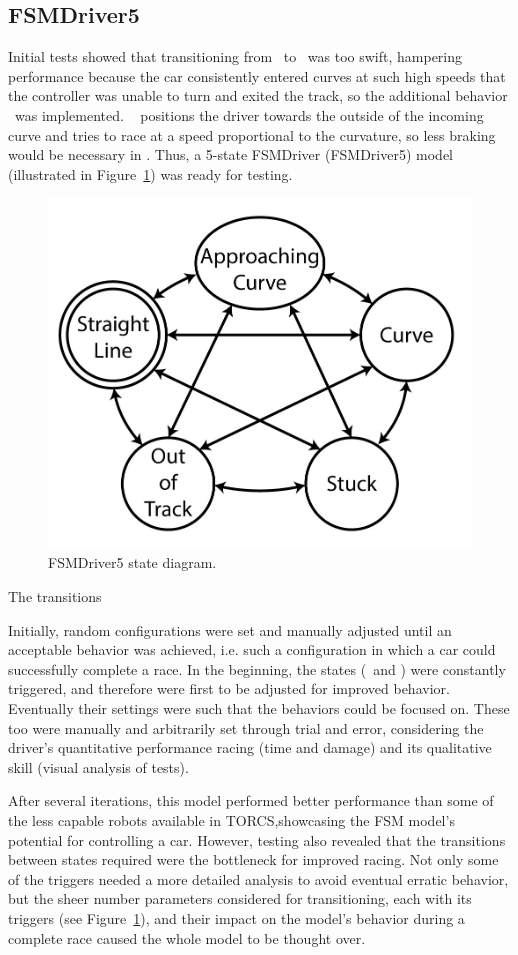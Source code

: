 \subsection{FSMDriver5}

Initial tests showed that transitioning from \SL~to \C~was too swift, hampering performance because the car consistently entered curves at such high speeds that the controller was unable to turn and exited the track, so the additional behavior \AC~was implemented. \AC~ positions the driver towards the outside of the incoming curve and tries to race at a speed proportional to the curvature, so less braking would be necessary in \C. Thus, a 5-state FSMDriver (FSMDriver5) model (illustrated in Figure~\ref{Fig:FSM5Diagram}) was ready for testing.

\begin{figure}[h]
	\centering
	\includegraphics[width=.45\textwidth]{FiveStateFSM}
	\caption{FSMDriver5 state diagram.}
	\label{Fig:FSM5Diagram}
\end{figure}


The transitions %

Initially, random configurations were set and manually adjusted until an acceptable behavior was achieved, i.e. such a configuration in which a car could successfully complete a race. In the beginning, the  states (\OT~and \St) were constantly triggered, and therefore were first to be adjusted for improved behavior. Eventually their settings were such that the  behaviors could be focused on. These too were manually and arbitrarily set through trial and error, considering the driver's quantitative performance racing (time and damage) and its qualitative skill (visual analysis of tests).

After several iterations, this model performed better performance than some of the less capable robots available in TORCS,showcasing the FSM model's potential for controlling a car. However, testing also revealed that the transitions between states required were the bottleneck for improved racing. Not only some of the triggers needed a more detailed analysis to avoid eventual erratic behavior, but the sheer number parameters considered for transitioning, each with its triggers (see Figure~\ref{Fig:FSM5Diagram}), and their impact on the model's behavior during a complete race caused the whole model to be thought over.

